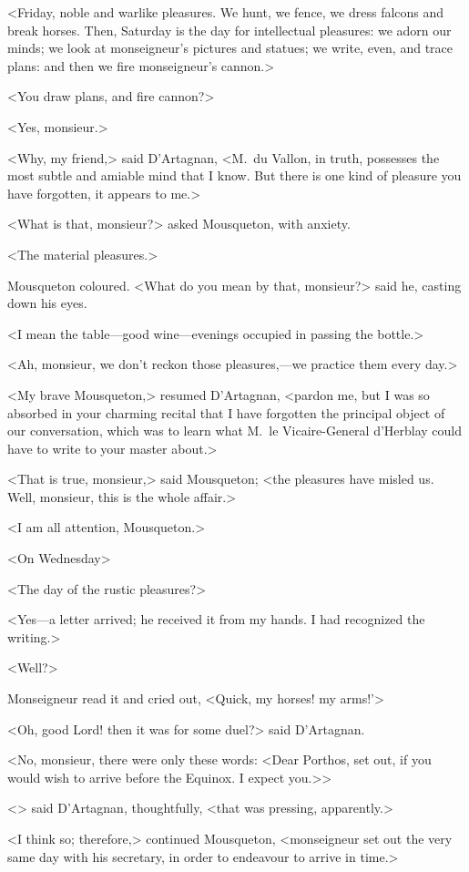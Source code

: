 <Friday, noble and warlike pleasures. We hunt, we fence, we dress falcons and break horses. Then, Saturday is the day for intellectual pleasures: we adorn our minds; we look at monseigneur's pictures and statues; we write, even, and trace plans: and then we fire monseigneur's cannon.>

<You draw plans, and fire cannon?>

<Yes, monsieur.>

<Why, my friend,> said D'Artagnan, <M.~du Vallon, in truth, possesses the most subtle and amiable mind that I know. But there is one kind of pleasure you have forgotten, it appears to me.>

<What is that, monsieur?> asked Mousqueton, with anxiety.

<The material pleasures.>

Mousqueton coloured. <What do you mean by that, monsieur?> said he, casting down his eyes.

<I mean the table—good wine—evenings occupied in passing the bottle.>

<Ah, monsieur, we don't reckon those pleasures,—we practice them every day.>

<My brave Mousqueton,> resumed D'Artagnan, <pardon me, but I was so absorbed in your charming recital that I have forgotten the principal object of our conversation, which was to learn what M.~le Vicaire-General d'Herblay could have to write to your master about.>

<That is true, monsieur,> said Mousqueton; <the pleasures have misled us. Well, monsieur, this is the whole affair.>

<I am all attention, Mousqueton.>

<On Wednesday\longdash>

<The day of the rustic pleasures?>

<Yes—a letter arrived; he received it from my hands. I had recognized the writing.>

<Well?>

Monseigneur read it and cried out, <Quick, my horses! my arms!'>

<Oh, good Lord! then it was for some duel?> said D'Artagnan.

<No, monsieur, there were only these words: <Dear Porthos, set out, if you would wish to arrive before the Equinox. I expect you.>>

<> said D'Artagnan, thoughtfully, <that was pressing, apparently.>

<I think so; therefore,> continued Mousqueton, <monseigneur set out the very same day with his secretary, in order to endeavour to arrive in time.>

